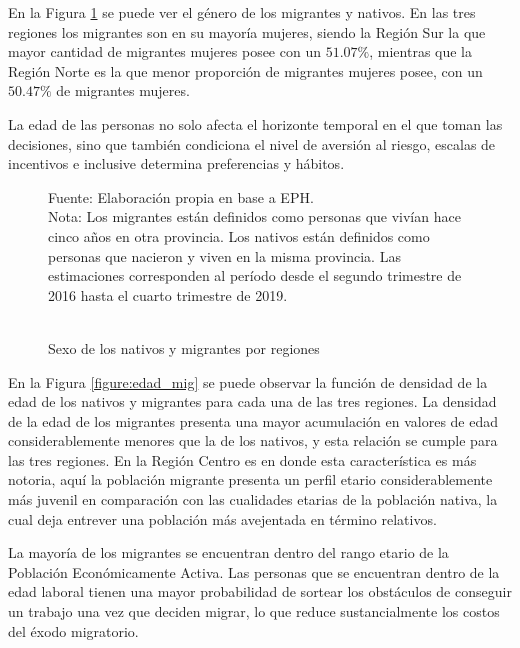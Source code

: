 \documentclass[12pt,a4paper]{article}
\begin{document}
En la Figura \ref{figure:sexo_mig_} se puede ver el género de los migrantes y nativos. En las tres regiones los migrantes son en su mayoría mujeres, siendo la Región Sur la que mayor cantidad de migrantes mujeres posee con un $51.07\%$, mientras que la Región Norte es la que menor proporción de migrantes mujeres posee, con un $50.47\%$ de migrantes mujeres.

La edad de las personas no solo afecta el horizonte temporal en el que toman las decisiones, sino que también condiciona el nivel de aversión al riesgo, escalas de incentivos e inclusive determina preferencias y hábitos.

\begin{figure}[ht!]
\begin{center}
 	\caption{\\Sexo de los nativos y migrantes por regiones}
 
 	\label{figure:sexo_mig_}
\begin{flushleft}
\begin{scriptsize}
Fuente: Elaboración propia en base a EPH.\\
Nota: Los migrantes están definidos como personas que vivían hace cinco años en otra provincia. Los nativos están definidos como personas que nacieron y viven en la misma provincia. Las estimaciones corresponden al período desde el segundo trimestre de 2016 hasta el cuarto trimestre de 2019.\\
\end{scriptsize}
\end{flushleft}
\end{center}
\end{figure}
\newpage


En la Figura \ref{figure:edad_mig} se puede observar la función de densidad de la edad de los nativos y migrantes para cada una de las tres regiones. La densidad de la edad de los migrantes presenta una mayor acumulación en valores de edad considerablemente menores que la de los nativos, y esta relación se cumple para las tres regiones. En la Región Centro es en donde esta característica es más notoria, aquí la población migrante presenta un perfil etario considerablemente más juvenil en comparación con las cualidades etarias de la población nativa, la cual deja entrever una población más avejentada en término relativos.

La mayoría de los migrantes se encuentran dentro del rango etario de la Población Económicamente Activa. Las personas que se encuentran dentro de la edad laboral tienen una mayor probabilidad de sortear los obstáculos de conseguir un trabajo una vez que deciden migrar, lo que reduce sustancialmente los costos del éxodo migratorio.
\end{document}

